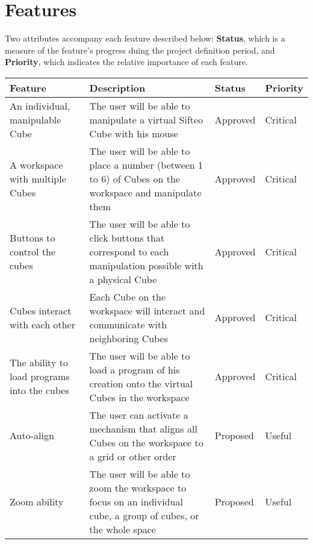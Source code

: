 \documentclass[12pt]{article}
\begin{document}
\section{Features}
Two attributes accompany each feature described below: \textbf{Status}, which is a measure of the feature's progress duing the project definition period, and \textbf{Priority}, which indicates the relative importance of each feature.
    \begin{table}[h]
      \begin{tabular}{p{1.5in} | p{1.75in} | p{1in} | p{1in}}
        \textbf{Feature} & \textbf{Description} & \textbf{Status} & \textbf{Priority} \\ \hline

        An individual, manipulable Cube &
        The user will be able to manipulate a virtual Sifteo Cube with his mouse &
        Approved &
        Critical \\ \hline

        A workspace with multiple Cubes &
        The user will be able to place a number (between 1 to 6) of Cubes on the workspace and manipulate them &
        Approved &
        Critical \\ \hline

        Buttons to control the cubes &
        The user will be able to click buttons that correspond to each manipulation possible with a physical Cube &
        Approved &
        Critical \\ \hline

        Cubes interact with each other &
        Each Cube on the workspace will interact and communicate with neighboring Cubes &
        Approved &
        Critical \\ \hline

        The ability to load programs into the cubes &
        The user will be able to load a program of his creation onto the virtual Cubes in the workspace &
        Approved &
        Critical \\ \hline

        Auto-align &
        The user can activate a mechanism that aligns all Cubes on the workspace to a grid or other order &
        Proposed &
        Useful \\ \hline

        Zoom ability &
        The user will be able to zoom the workspace to focus on an individual cube, a group of cubes, or the whole space &
        Proposed &
        Useful
      \end{tabular}
    \end{table}
\end{document}
